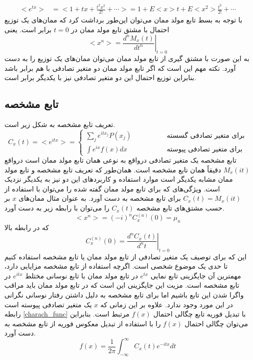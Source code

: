 \begin{equation}
\begin{aligned} <e^{t x}> &=<1+t x+\frac{t^{2} x^{2}}{2 !}+\cdots> =1+E<x> t+E<x^{2}> \frac{t^{2}}{2 !}+\cdots \end{aligned}
\label{mfg_expansion}
\end{equation}
با توجه به بسط تابع مولد ممان می‌توان این‌طور برداشت کرد که ممان‌های یک توزیع احتمال با مشتق تابع مولد ممان در $t=0$ برابر است. یعنی
\begin{equation}
    <x^{n}>=\left.\frac{d^{n} M_{x}(t)}{d t^{n}}\right|_{t=0}
\end{equation}
به این صورت با مشتق گیری از تابع مولد ممان می‌توان ممان‌های یک توزیع را به دست آورد.
نکته مهم این است که اگر تابع مولد ممان دو متغیر تصادفی با هم برابر باشد بنابراین توزیع احتمال این دو متغیر تصادفی نیز با یکدیگر برابر است.

\subsection{تابع مشخصه}
تعریف تابع مشخصه به شکل زیر است.
\begin{equation}
C_{x}(t)=<e^{i t x}>=\left\{\begin{array}{ll}{\sum_{j} e^{i t x_{j}} P(x_{j})} & \qquad \qquad {\text { برای متغیر تصادفی گسسته}} \\ 
{\int e^{i x} f(x) d x} & \qquad \qquad {\text { برای متغیر تصادفی پیوسته }}\end{array}\right.
\label{charach_func}
\end{equation}
تابع مشخصه یک متغیر تصادفی در‌واقع به نوعی همان تابع مولد ممان است درواقع $M_{x}(it)$ دقیقاً همان تابع مشخصه است. همان‌طور که تعریف تابع مشخصه و تابع مولد ممان مشابه یکدیگر است موارد استفاده و کاربردهای این دو نیز به یکدیگر نزدیک است. ویژگی‌های که برای تابع مولد ممان گفته شده را می‌توان با استفاده از $C_{x}(t) = M_{x}(it)$ برای تابع مشخصه به دست آورد. به عنوان مثال ممان‌های $x$ بر حسب مشتق‌های تابع مشخصه $C_{x}(t)$ را می‌توان با رابطه زیر به دست آورد.
\begin{equation}
    <x^{n}>=(-i)^{n} C_{x}^{(n)}(0) = \mu_{n}
\end{equation}
که در رابطه بالا 
$$
C_{x}^{( n )}(0) = \left. \frac{d^{n} C_{x}(t)}{d^{n} t} \right|_{t=0}
$$
این که برای توصیف یک متغیر تصادفی از تابع مولد ممان یا تابع مشخصه استفاده کنیم تا حدی یک موضوع شخصی است. اگرچه استفاده از تابع مشخصه مزایایی دارد، مهمترین آن جایگزینی تابع نمایی $e^{tx}$ در تابع مولد ممان با تابع نوسانی مختلط $e^{itx}$ در تابع مشخصه است. مزیت این جایگزینی این است که در تابع مولد ممان باید مراقب واگرا شدن این تابع باشیم اما برای تابع مشخصه به دلیل داشتن رفتار نوسانی نگرانی در این مورد وجود ندارد. علاوه بر این زمانی که $x$ یک متغیر تصادفی پیوسته است رابطه \ref{charach_func} با تبدیل فوریه تابع چگالی احتمال $f(x)$ مرتبط است. بنابراین می‌توان چگالی احتمال $f(x)$ را با استفاده از تبدیل معکوس فوریه از تابع مشخصه به دست آورد.
\begin{equation}
    f(x)=\frac{1}{2 \pi} \int_{-\infty}^{\infty} C_{x}(t) e^{-i t x} d t
\end{equation}

